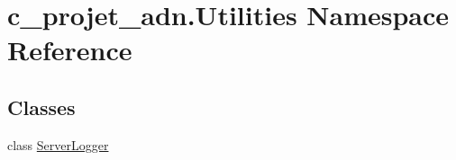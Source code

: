 \hypertarget{namespacec__projet__adn_1_1_utilities}{}\section{c\+\_\+projet\+\_\+adn.\+Utilities Namespace Reference}
\label{namespacec__projet__adn_1_1_utilities}
\subsection*{Classes}
\begin{DoxyCompactItemize}
\item 
class \hyperlink{classc__projet__adn_1_1_utilities_1_1_server_logger}{Server\+Logger}
\end{DoxyCompactItemize}
